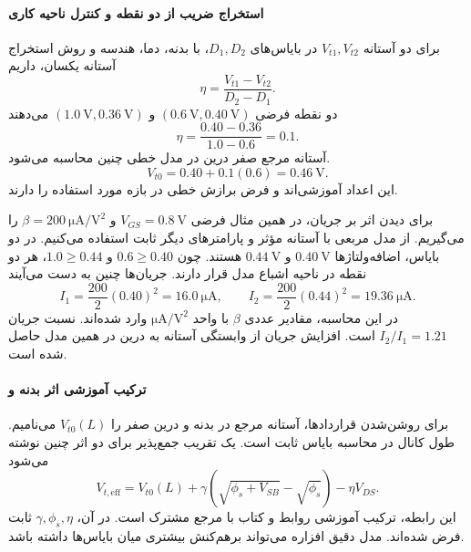 \paragraph*{استخراج ضریب از دو نقطه و کنترل ناحیه کاری}
برای دو آستانه \(V_{t1},V_{t2}\) در بایاس‌های \(D_1,D_2\)، با
بدنه، دما، هندسه و روش استخراج آستانه یکسان، داریم
\begin{equation}
 \eta=\frac{V_{t1}-V_{t2}}{D_2-D_1}.
 \label{eq:dibl-extraction}
\end{equation}
دو نقطه فرضی \((\qty{0.6}{\volt},\qty{0.40}{\volt})\) و
\((\qty{1.0}{\volt},\qty{0.36}{\volt})\) می‌دهند
\[
 \eta=\frac{0.40-0.36}{1.0-0.6}=0.1.
\]
آستانه مرجع صفر درین در مدل خطی چنین محاسبه می‌شود.
\[
 V_{t0}=0.40+0.1(0.6)=\qty{0.46}{\volt}.
\]
این اعداد آموزشی‌اند و فرض برازش خطی در بازه مورد استفاده را دارند.

برای دیدن اثر بر جریان، در همین مثال فرضی
\(V_{GS}=\qty{0.8}{\volt}\) و
\(\beta=\qty{200}{\micro\ampere\per\volt\squared}\) را می‌گیریم.
از مدل مربعی با آستانه مؤثر و پارامترهای دیگر ثابت استفاده می‌کنیم.
در دو بایاس، اضافه‌ولتاژها \(\qty{0.40}{\volt}\) و
\(\qty{0.44}{\volt}\) هستند. چون
\(0.6\ge0.40\) و \(1.0\ge0.44\)، هر دو نقطه در ناحیه اشباع مدل
قرار دارند. جریان‌ها چنین به دست می‌آیند
\begin{equation}
 I_1=\frac{200}{2}(0.40)^2=\qty{16.0}{\micro\ampere},\qquad
 I_2=\frac{200}{2}(0.44)^2=\qty{19.36}{\micro\ampere}.
 \label{eq:dibl-current-example}
\end{equation}
در این محاسبه، مقادیر عددی \(\beta\) با واحد
\(\unit{\micro\ampere\per\volt\squared}\) وارد شده‌اند.
نسبت جریان \(I_2/I_1=1.21\) است. افزایش جریان از وابستگی آستانه به
درین در همین مدل حاصل شده است.

\paragraph*{ترکیب آموزشی اثر بدنه و }
برای روشن‌شدن قراردادها، آستانه مرجع در بدنه و درین صفر را
\(V_{t0}(L)\) می‌نامیم. طول کانال در محاسبه بایاس ثابت است.
یک تقریب جمع‌پذیر برای دو اثر چنین نوشته می‌شود
\begin{equation}
 V_{t,\mathrm{eff}}=
 V_{t0}(L)+\gamma\left(\sqrt{\phi_s+V_{SB}}-\sqrt{\phi_s}\right)
 -\eta V_{DS}.
 \label{eq:threshold-combined}
\end{equation}
این رابطه، ترکیب آموزشی روابط  و  کتاب با
مرجع مشترک است. در آن، \(\gamma,\phi_s,\eta\) ثابت فرض شده‌اند.
مدل دقیق افزاره می‌تواند برهم‌کنش بیشتری میان بایاس‌ها داشته باشد.

